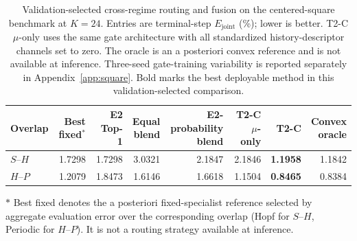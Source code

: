 \par
\begin{table}[H]
\centering
\caption{
Validation-selected cross-regime routing and fusion on the centered-square benchmark at $K=24$. Entries are terminal-step $E_{\mathrm{joint}}$ (\%); lower is better. T2-C $\mu$-only uses the same gate architecture with all standardized history-descriptor channels set to zero. The oracle is an a posteriori convex reference and is not available at inference. Three-seed gate-training variability is reported separately in
Appendix~\ref{app:square}. Bold marks the best deployable method in this validation-selected comparison.
}
\label{tab:routing_fusion}
\small
\setlength{\tabcolsep}{3.5pt}
\begin{threeparttable}
\begin{tabular}{@{}lrrrrrrr@{}}
\toprule
Overlap & Best fixed$^\ast$ & E2 Top-1 & \shortstack{Equal\\blend} & \shortstack{E2-probability\\blend} & \shortstack{T2-C\\$\mu$-only} & T2-C & \shortstack{Convex\\oracle}\\
\midrule
$S$--$H$ & 1.7298 & 1.7298 & 3.0321 & 2.1847 & 2.1846 & \textbf{1.1958} & 1.1842 \\
$H$--$P$ & 1.2079 & 1.8473 & 1.6146 & 1.6618 & 1.1504 & \textbf{0.8465} & 0.8384 \\
\bottomrule
\end{tabular}
\begin{tablenotes}[flushleft]
\footnotesize
\item[$\ast$] Best fixed denotes the a posteriori fixed-specialist reference selected by aggregate evaluation error over the corresponding overlap (Hopf for $S$--$H$, Periodic for $H$--$P$). It is not a routing strategy available at inference.
\end{tablenotes}
\end{threeparttable}
\end{table}
\par

